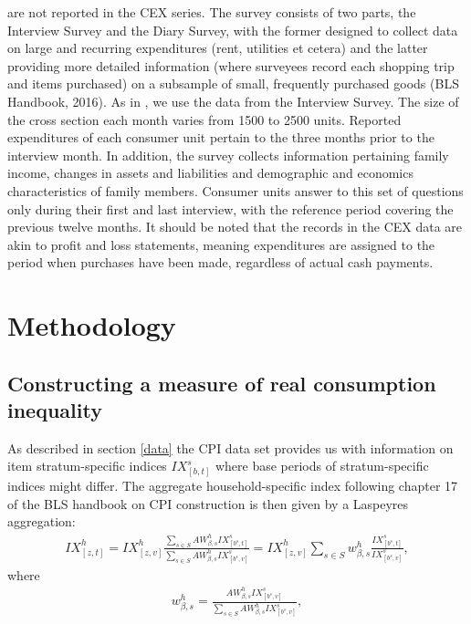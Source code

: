 \documentclass{article}
\begin{document}
are not reported in the CEX series.  The survey consists of two parts, the Interview Survey and the Diary Survey, with the former designed to collect data on large and recurring expenditures (rent, utilities et cetera) and the latter providing more detailed information (where surveyees record each shopping trip and items purchased)  on a subsample of small, frequently purchased goods (BLS Handbook, 2016). As in \cite{Coibion2017InnocentInequality}, we use the data from the Interview Survey. The size of the cross section each month varies from 1500  to 2500 units. Reported expenditures of each consumer unit pertain to the three months prior to the interview month. In addition, the survey collects information pertaining family income, changes in assets and liabilities and demographic and economics characteristics of family members. Consumer units answer to this set of questions only during their first and last interview, with the reference period covering the previous twelve months. It should be noted that the records in the CEX data are akin to profit and loss statements, meaning expenditures are assigned to the period when purchases have been made, regardless of actual cash payments.  


\section{Methodology}
\subsection{Constructing a measure of real consumption inequality}\label{method}
As described in section \ref{data} the CPI data set provides us with information on item stratum-specific indices $IX^s_{[b,t]}$ where base periods of stratum-specific indices might differ. %
The aggregate household-specific index following chapter 17 of the BLS handbook on CPI construction is then given by a Laspeyres aggregation:
\begin{align}\label{agg_index_hh}
    IX^h_{[z,t]}= IX^h_{[z,v]}\frac{\sum_{s\in S}AW^h_{\beta,s}IX^s_{[b^s,t]}}{\sum_{s\in S}AW^h_{\beta,s}IX^s_{[b^s,v]}}=IX^h_{[z,v]}\sum_{s\in S}w^h_{\beta,s}\frac{IX^s_{[b^s,t]}}{IX^s_{[b^s,v]}},
\end{align}
where 
\begin{align*}
    w^h_{\beta,s}= \frac{AW^h_{\beta,s} IX^s_{[b^s,v]}}{\sum_{s\in S}AW^h_{\beta,s} IX^s_{[b^s,v]}},
\end{align*}
\end{document}
